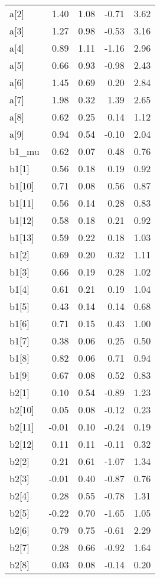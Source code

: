 \documentclass[12pt,]{article}
\begin{document}
\begin{table}[ht]
{\begin{tabular}{lrrrr}
  a[2] & 1.40 & 1.08 & -0.71 & 3.62 \\ 
  a[3] & 1.27 & 0.98 & -0.53 & 3.16 \\ 
  a[4] & 0.89 & 1.11 & -1.16 & 2.96 \\ 
  a[5] & 0.66 & 0.93 & -0.98 & 2.43 \\ 
  a[6] & 1.45 & 0.69 & 0.20 & 2.84 \\ 
  a[7] & 1.98 & 0.32 & 1.39 & 2.65 \\ 
  a[8] & 0.62 & 0.25 & 0.14 & 1.12 \\ 
  a[9] & 0.94 & 0.54 & -0.10 & 2.04 \\ 
  b1\_mu & 0.62 & 0.07 & 0.48 & 0.76 \\ 
  b1[1] & 0.56 & 0.18 & 0.19 & 0.92 \\ 
  b1[10] & 0.71 & 0.08 & 0.56 & 0.87 \\ 
  b1[11] & 0.56 & 0.14 & 0.28 & 0.83 \\ 
  b1[12] & 0.58 & 0.18 & 0.21 & 0.92 \\ 
  b1[13] & 0.59 & 0.22 & 0.18 & 1.03 \\ 
  b1[2] & 0.69 & 0.20 & 0.32 & 1.11 \\ 
  b1[3] & 0.66 & 0.19 & 0.28 & 1.02 \\ 
  b1[4] & 0.61 & 0.21 & 0.19 & 1.04 \\ 
  b1[5] & 0.43 & 0.14 & 0.14 & 0.68 \\ 
  b1[6] & 0.71 & 0.15 & 0.43 & 1.00 \\ 
  b1[7] & 0.38 & 0.06 & 0.25 & 0.50 \\ 
  b1[8] & 0.82 & 0.06 & 0.71 & 0.94 \\ 
  b1[9] & 0.67 & 0.08 & 0.52 & 0.83 \\ 
  b2[1] & 0.10 & 0.54 & -0.89 & 1.23 \\ 
  b2[10] & 0.05 & 0.08 & -0.12 & 0.23 \\ 
  b2[11] & -0.01 & 0.10 & -0.24 & 0.19 \\ 
  b2[12] & 0.11 & 0.11 & -0.11 & 0.32 \\ 
  b2[2] & 0.21 & 0.61 & -1.07 & 1.34 \\ 
  b2[3] & -0.01 & 0.40 & -0.87 & 0.76 \\ 
  b2[4] & 0.28 & 0.55 & -0.78 & 1.31 \\ 
  b2[5] & -0.22 & 0.70 & -1.65 & 1.05 \\ 
  b2[6] & 0.79 & 0.75 & -0.61 & 2.29 \\ 
  b2[7] & 0.28 & 0.66 & -0.92 & 1.64 \\ 
  b2[8] & 0.03 & 0.08 & -0.14 & 0.20 \\ 

\end{tabular}}
\end{table}
\end{document}
